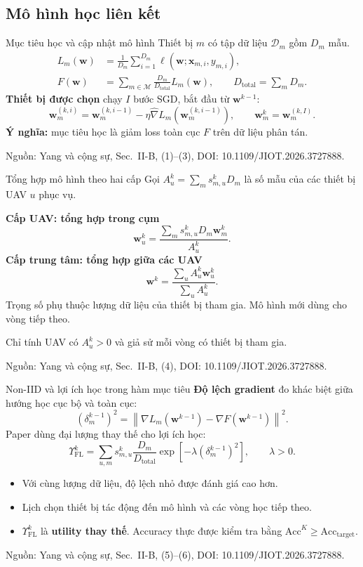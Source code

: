 \documentclass[aspectratio=169,11pt]{beamer}
\newcommand{\source}[1]{\par\vfill{\tiny\color{Muted}Nguồn: #1\par}}
\newcommand{\paperref}[1]{\source{Yang và cộng sự, Sec.~#1, DOI: 10.1109/JIOT.2026.3727888.}}
\newcommand{\FL}{\mathrm{FL}}
\newcommand{\tot}{\mathrm{total}}
\newcommand{\Acc}{\mathrm{Acc}}
\begin{document}
\subsection{Mô hình học liên kết}

\begin{frame}{Mục tiêu học và cập nhật mô hình}
  Thiết bị $m$ có tập dữ liệu $\mathcal D_m$ gồm $D_m$ mẫu.
  \begin{align*}
    L_m(\mathbf w)
      &=\frac{1}{D_m}\sum_{i=1}^{D_m}\ell(\mathbf w;\mathbf x_{m,i},y_{m,i}),\\
    F(\mathbf w)
      &=\sum_{m\in\mathcal M}\frac{D_m}{D_{\tot}}L_m(\mathbf w),
      \qquad D_{\tot}=\sum_m D_m.
  \end{align*}
  \textbf{Thiết bị được chọn} chạy $I$ bước SGD, bắt đầu từ $\mathbf w^{k-1}$:
  \[
    \mathbf w_m^{(k,i)}=\mathbf w_m^{(k,i-1)}
       -\eta\widehat{\nabla}L_m(\mathbf w_m^{(k,i-1)}),
    \qquad \mathbf w_m^k=\mathbf w_m^{(k,I)}.
  \]
  \textbf{Ý nghĩa:} mục tiêu học là giảm loss toàn cục $F$ trên dữ liệu phân tán.
  \paperref{II-B, (1)--(3)}
\end{frame}

\begin{frame}{Tổng hợp mô hình theo hai cấp}
  Gọi $A_u^k=\sum_m s^k_{m,u}D_m$ là số mẫu của các thiết bị UAV $u$ phục vụ.

  \textbf{Cấp UAV: tổng hợp trong cụm}
  \[
    \mathbf w_u^k=\frac{\sum_m s^k_{m,u}D_m\mathbf w_m^k}{A_u^k}.
  \]
  \textbf{Cấp trung tâm: tổng hợp giữa các UAV}
  \[
    \mathbf w^k=\frac{\sum_u A_u^k\mathbf w_u^k}{\sum_u A_u^k}.
  \]
  Trọng số phụ thuộc lượng dữ liệu của thiết bị tham gia. Mô hình mới dùng cho vòng tiếp theo.
  \par{\footnotesize Chỉ tính UAV có $A_u^k>0$ và giả sử mỗi vòng có thiết bị tham gia.}
  \paperref{II-B, (4)}
\end{frame}

\begin{frame}{Non-IID và lợi ích học trong hàm mục tiêu}
  \textbf{Độ lệch gradient} đo khác biệt giữa hướng học cục bộ và toàn cục:
  \[
    (\delta_m^{k-1})^2=
      \left\|\nabla L_m(\mathbf w^{k-1})-\nabla F(\mathbf w^{k-1})\right\|^2.
  \]
  Paper dùng đại lượng thay thế cho lợi ích học:
  \[
    \Upsilon_{\FL}^k=\sum_{u,m}s^k_{m,u}\frac{D_m}{D_{\tot}}
      \exp\!\left[-\lambda(\delta_m^{k-1})^2\right],\qquad\lambda>0.
  \]
  \begin{itemize}
    \item Với cùng lượng dữ liệu, độ lệch nhỏ được đánh giá cao hơn.
    \item Lịch chọn thiết bị tác động đến mô hình và các vòng học tiếp theo.
    \item $\Upsilon_{\FL}^k$ là \textbf{utility thay thế}. Accuracy thực được kiểm tra bằng $\Acc^K\geq\Acc_{\mathrm{target}}$.
  \end{itemize}
  \paperref{II-B, (5)--(6)}
\end{frame}
\end{document}
